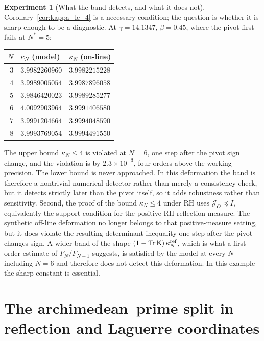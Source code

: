 \documentclass[11pt]{amsart}
\numberwithin{equation}{section}
\theoremstyle{plain}
\theoremstyle{definition}
\newtheorem{experiment}[theorem]{Experiment}
\theoremstyle{remark}
\newcommand{\Kmat}{\mathsf K}
\newcommand{\Tr}{\operatorname{Tr}}
\begin{document}
\begin{experiment}[What the band detects, and what it does not]
\label{exp:band_detection}
Corollary~\ref{cor:kappa_le_4} is a necessary condition; the question is whether it is
sharp enough to be a diagnostic.  At $\gamma=14.1347$, $\beta=0.45$, where the pivot first
fails at $N^*=5$:
\begin{center}
\small
\begin{tabular}{rll}
\toprule
$N$ & $\kappa_N$ (model) & $\kappa_N$ (on-line)\\
\midrule
$3$ & $3.9982260960$ & $3.9982215228$\\
$4$ & $3.9989005054$ & $3.9987896058$\\
$5$ & $3.9846420023$ & $3.9989285277$\\
$6$ & $\mathbf{4.0092903964}$ & $3.9991406580$\\
$7$ & $3.9991204664$ & $3.9994048590$\\
$8$ & $3.9993769054$ & $3.9994491550$\\
\bottomrule
\end{tabular}
\end{center}
The upper bound $\kappa_N\le4$ is violated at $N=6$, one step after the pivot sign change,
and the violation is by $2.3\times10^{-3}$, four orders above the working precision.  The
lower bound is never approached.  In this deformation the band is therefore a nontrivial numerical detector rather than merely a consistency check, but it detects strictly later than the pivot itself, so it adds robustness rather than sensitivity.  Second, the proof of the bound $\kappa_N\le4$ under RH uses $\mathcal J_O\preceq I$, equivalently the support condition for the positive RH reflection measure.  The synthetic off-line deformation no longer belongs to that positive-measure setting, but it does violate the resulting determinant inequality one step after the pivot changes sign.  A wider band of the shape
$(1-\Tr\Kmat)\,\kappa_N^{\rm ref}$, which is what a first-order estimate of $F_N/F_{N-1}$
suggests, is satisfied by the model at every $N$ including $N=6$ and therefore does not detect this deformation.  In this example the sharp constant is essential.
\end{experiment}



\section{The archimedean--prime split in reflection and Laguerre coordinates}
\label{sec:arch_prime_laguerre}
\end{document}

